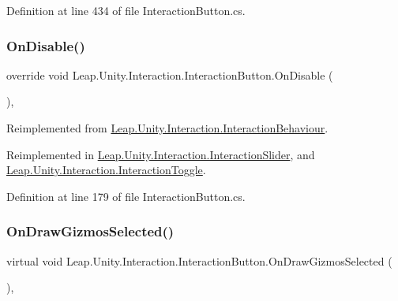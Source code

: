 Definition at line 434 of file Interaction\+Button.\+cs.

\mbox{\label{class_leap_1_1_unity_1_1_interaction_1_1_interaction_button_a678babacbcc3d91d865ea76462a30aec}} 
\subsubsection{\texorpdfstring{OnDisable()}{OnDisable()}}
{\footnotesize\ttfamily override void Leap.\+Unity.\+Interaction.\+Interaction\+Button.\+On\+Disable (\begin{DoxyParamCaption}{ }\end{DoxyParamCaption})\hspace{0.3cm}{\ttfamily [protected]}, {\ttfamily [virtual]}}



Reimplemented from \mbox{\hyperlink{class_leap_1_1_unity_1_1_interaction_1_1_interaction_behaviour_a294a2ea9c5524c0c8460006df32371b2}{Leap.\+Unity.\+Interaction.\+Interaction\+Behaviour}}.



Reimplemented in \mbox{\hyperlink{class_leap_1_1_unity_1_1_interaction_1_1_interaction_slider_ab466b7324c426f9a77797130729ca9a6}{Leap.\+Unity.\+Interaction.\+Interaction\+Slider}}, and \mbox{\hyperlink{class_leap_1_1_unity_1_1_interaction_1_1_interaction_toggle_a9cbebe0123cbea22e469877317fa97ac}{Leap.\+Unity.\+Interaction.\+Interaction\+Toggle}}.



Definition at line 179 of file Interaction\+Button.\+cs.

\mbox{\label{class_leap_1_1_unity_1_1_interaction_1_1_interaction_button_a3cf601cd070b0d92bda43ed675d2f367}} 
\subsubsection{\texorpdfstring{OnDrawGizmosSelected()}{OnDrawGizmosSelected()}}
{\footnotesize\ttfamily virtual void Leap.\+Unity.\+Interaction.\+Interaction\+Button.\+On\+Draw\+Gizmos\+Selected (\begin{DoxyParamCaption}{ }\end{DoxyParamCaption})\hspace{0.3cm}{\ttfamily [protected]}, {\ttfamily [virtual]}}



